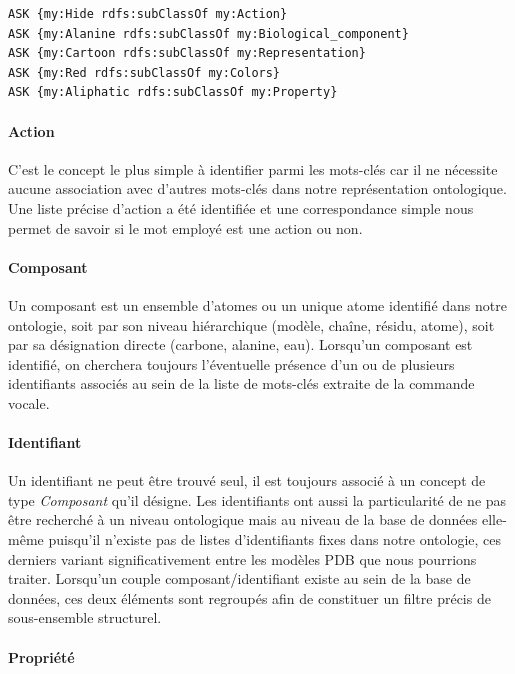 \begin{lstlisting}[language=XML, caption=Requêtes SPARQL effectuées pour tester la nature des mots-clés entrés par l'utilisateur]
ASK {my:Hide rdfs:subClassOf my:Action}
ASK {my:Alanine rdfs:subClassOf my:Biological_component}
ASK {my:Cartoon rdfs:subClassOf my:Representation}
ASK {my:Red rdfs:subClassOf my:Colors}
ASK {my:Aliphatic rdfs:subClassOf my:Property}
\end{lstlisting}

\paragraph{Action}

C'est le concept le plus simple à identifier parmi les mots-clés car il ne nécessite aucune association avec d'autres mots-clés dans notre représentation ontologique. Une liste précise d'action a été identifiée et une correspondance simple nous permet de savoir si le mot employé est une action ou non.

\paragraph{Composant}

Un composant est un ensemble d'atomes ou un unique atome identifié dans notre ontologie, soit par son niveau hiérarchique (modèle, chaîne, résidu, atome), soit par sa désignation directe (carbone, alanine, eau). Lorsqu'un composant est identifié, on cherchera toujours l'éventuelle présence d'un ou de plusieurs identifiants associés au sein de la liste de mots-clés extraite de la commande vocale.

\paragraph{Identifiant}

Un identifiant ne peut être trouvé seul, il est toujours associé à un concept de type \textit{Composant} qu'il désigne. Les identifiants ont aussi la particularité de ne pas être recherché à un niveau ontologique mais au niveau de la base de données elle-même puisqu'il n'existe pas de listes d'identifiants fixes dans notre ontologie, ces derniers variant significativement entre les modèles PDB que nous pourrions traiter. Lorsqu'un couple composant/identifiant existe au sein de la base de données, ces deux éléments sont regroupés afin de constituer un filtre précis de sous-ensemble structurel.

\paragraph{Propriété}

